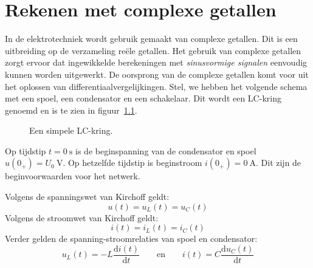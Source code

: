 

\chapter{Rekenen met complexe getallen}
\label{cha:complex}
In de elektrotechniek wordt gebruik gemaakt van complexe getallen. Dit is een uitbreiding op de verzameling reële getallen. Het gebruik van complexe getallen zorgt ervoor dat ingewikkelde berekeningen met \textsl{sinusvormige signalen} eenvoudig kunnen worden uitgewerkt. De oorsprong van de complexe getallen komt voor uit het oplossen van differentiaalvergelijkingen. Stel, we hebben het volgende schema met een spoel, een condensator en een schakelaar. Dit wordt een LC-kring genoemd en is te zien in figuur~\ref{fig:comlckring}.

\begin{figure}[!ht]
\centering
{}
\caption{Een simpele LC-kring.}
\label{fig:comlckring}
\end{figure}

Op tijdstip $t=\SI{0}{\second}$ is de beginspanning van de condensator en spoel $u(0_+)=U_0\ \si{\volt}$. Op hetzelfde tijdstip is beginstroom $i(0_+)=\SI{0}{\ampere}$. Dit zijn de beginvoorwaarden voor het netwerk.

Volgens de spanningswet van Kirchoff geldt:
\begin{equation}
u(t) = u_L(t) = u_C(t)
\end{equation}
%
Volgens de stroomwet van Kirchoff geldt:
%
\begin{equation}
i(t) = i_L(t) = i_C(t)
\end{equation}
%
Verder gelden de spanning-stroomrelaties van spoel en condensator:
%
\begin{equation}
u_L(t) = -L\dfrac{\mathrm{d}i(t)}{\mathrm{d}t} \qquad \text{en} \qquad i(t) = C\dfrac{\mathrm{d}u_C(t)}{\mathrm{d}t}
\end{equation}

